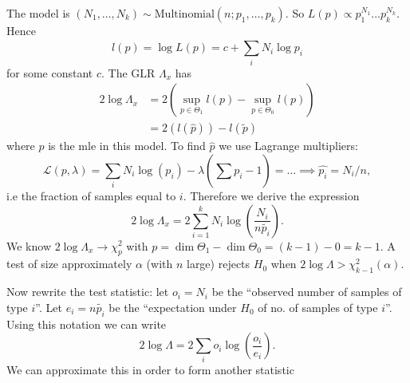 \documentclass[egregdoesnotlikesansseriftitles,a4paper]{scrartcl}
\begin{document}
The model is $(N_1 , \ldots, N_k) \sim \text{Multinomial}(n; p_1 , \ldots, p_{k})$. So $L (p) \propto p_1^{N_1 } \ldots p_{k}^{N_{k}}$. Hence \[
l (p)=\log L (p)= c+ \sum_{i}^{}N_{i} \log p_{i}
\] for some constant $c$. The GLR $\Lambda_{x}$ has 
\begin{align*}
     2 \log \Lambda_{x}&=2 (\sup_{p \in \Theta_1 }l (p)-\sup_{p \in \Theta_0}l (p))\\
     &= 2 (l (\hat{p}))-l (\widetilde{p})
\end{align*}
where $\hat{p}$ is the mle in this model. To find $\hat{p}$ we use Lagrange multipliers: \[
\mathcal{L}(p,\lambda)= \sum_{i}^{}N_{i}\log (p_{i})-\lambda (\sum_{}^{}p_{i}-1)=\ldots \implies \hat{p_i}=N_{i}/n
,\] i.e the fraction of samples equal to $i$. Therefore we derive the expression \[
2 \log \Lambda_{x}= 2 \sum_{i=1}^{k}N_{i} \log \left( \frac{N_{i}}{n \widetilde{p_i}}\right)
.\] We know $2 \log \Lambda_{x} \rightarrow \chi_{p}^2$ with $p=\operatorname{dim} \Theta_1 -\operatorname{dim} \Theta_0 = (k-1)-0=k-1$. A test of size approximately $\alpha$ (with $n$ large) rejects $H_0 $ when $2 \log \Lambda > \chi_{k-1}^2 (\alpha)$.

Now rewrite the test statistic: let $o_i=N_i$ be the ``observed number of samples of type $i$''. Let $e_i= n \widetilde{p_i}$ be the ``expectation under $H_0 $ of no. of samples of type $i$''. Using this notation we can write \[
2 \log \Lambda = 2 \sum_{i}^{}o_i \log \left( \frac{o_i}{e_i}\right)
.\] We can approximate this in order to form another statistic
\end{document}

